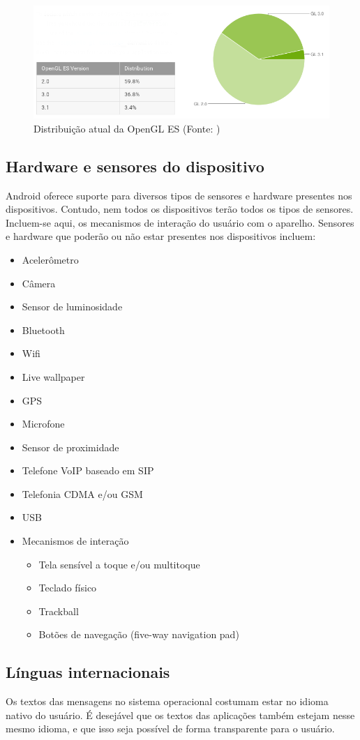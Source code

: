 \begin{figure}[h]
    \centering
    \includegraphics[width=15cm]{img/opengl}
    \caption[Distribuição atual da OpenGL ES]{Distribuição atual da OpenGL ES (Fonte: \cite{dashboards})}
    \label{distribuicao_opengl}
\end{figure}

\subsection{Hardware e sensores do dispositivo}

Android oferece suporte para diversos tipos de sensores e hardware presentes nos 
dispositivos. Contudo, nem todos os dispositivos terão todos os tipos de sensores.
Incluem-se aqui, os mecanismos de interação do usuário com o aparelho.
Sensores e hardware que poderão ou não estar presentes nos dispositivos incluem:
\begin{itemize}
    \item Acelerômetro
    \item Câmera
    \item Sensor de luminosidade
    \item Bluetooth
    \item Wifi
    \item Live wallpaper
    \item GPS
    \item Microfone
    \item Sensor de proximidade
    \item Telefone VoIP baseado em SIP
    \item Telefonia CDMA e/ou GSM
    \item USB
    \item Mecanismos de interação
    \begin{itemize}
        \item Tela sensível a toque e/ou multitoque
        \item Teclado físico
        \item Trackball
        \item Botões de navegação (five-way navigation pad)
    \end{itemize}
\end{itemize}

\subsection{Línguas internacionais}
Os textos das mensagens no sistema operacional costumam estar no idioma nativo do usuário.
É desejável que os textos das aplicações também estejam nesse mesmo idioma, e que 
isso seja possível de forma transparente para o usuário.

